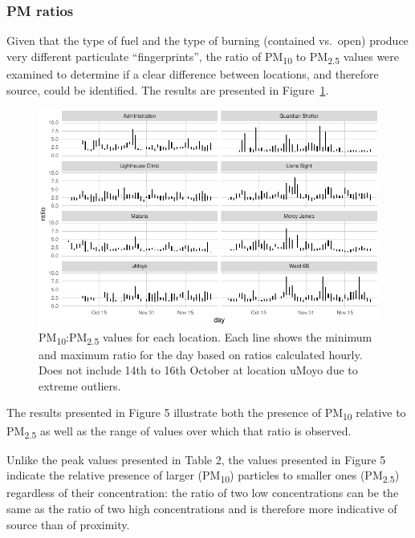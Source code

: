 \documentclass[
  authoryear,
  review,
  3p]{elsarticle}
\begin{document}
\hypertarget{pm-ratios}{%
\subsubsection{PM ratios}\label{pm-ratios}}

Given that the type of fuel and the type of burning (contained vs.~open)
produce very different particulate ``fingerprints'', the ratio of
PM\textsubscript{10} to PM\textsubscript{2.5} values were examined to
determine if a clear difference between locations, and therefore source,
could be identified. The results are presented in
Figure~\ref{fig-pm-ratios}.

\begin{figure}

{\centering \includegraphics{manuscript-qech-air-quality-tilley_files/figure-pdf/fig-pm-ratios-1.pdf}

}

\caption{\label{fig-pm-ratios}PM\textsubscript{10}:PM\textsubscript{2.5}
values for each location. Each line shows the minimum and maximum ratio
for the day based on ratios calculated hourly. Does not include 14th to
16th October at location uMoyo due to extreme outliers.}

\end{figure}

The results presented in Figure 5 illustrate both the presence of
PM\textsubscript{10} relative to PM\textsubscript{2.5} as well as the
range of values over which that ratio is observed.

Unlike the peak values presented in Table 2, the values presented in
Figure 5 indicate the relative presence of larger (PM\textsubscript{10})
particles to smaller ones (PM\textsubscript{2.5}) regardless of their
concentration: the ratio of two low concentrations can be the same as
the ratio of two high concentrations and is therefore more indicative of
source than of proximity.
\end{document}

